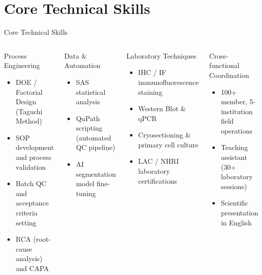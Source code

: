 \documentclass[aspectratio=169,10pt]{beamer}
\begin{document}
\section{Core Technical Skills}
\begin{frame}{Core Technical Skills}
  \begin{columns}[T]
      \begin{block}{Process Engineering}
        \small
        \begin{itemize}
          \item DOE / Factorial Design (Taguchi Method)
          \item SOP development and process validation
          \item Batch QC and acceptance criteria setting
          \item RCA (root-cause analysis) and CAPA
        \end{itemize}
      \end{block}
      \vspace{0.1cm}
      \begin{block}{Data \& Automation}
        \small
        \begin{itemize}
          \item SAS statistical analysis
          \item QuPath scripting (automated QC pipeline)
          \item AI segmentation model fine-tuning
        \end{itemize}
      \end{block}

      \begin{block}{Laboratory Techniques}
        \small
        \begin{itemize}
          \item IHC / IF immunofluorescence staining
          \item Western Blot \& qPCR
          \item Cryosectioning \& primary cell culture
          \item LAC / NHRI laboratory certifications
        \end{itemize}
      \end{block}
      \vspace{0.1cm}
      \begin{block}{Cross-functional Coordination}
        \small
        \begin{itemize}
          \item 100+ member, 5-institution field operations
          \item Teaching assistant (30+ laboratory sessions)
          \item Scientific presentation in English
        \end{itemize}
      \end{block}
  \end{columns}
\end{frame}
\end{document}
